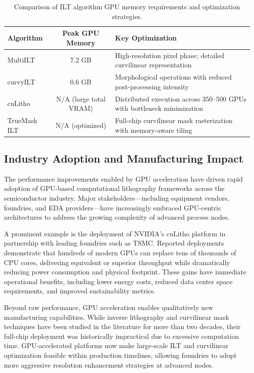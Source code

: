 \documentclass[pdflatex,sn-mathphys-num]{sn-jnl}%
\theoremstyle{thmstyleone}%
\theoremstyle{thmstyletwo}%
\theoremstyle{thmstylethree}%
\begin{document}
\begin{table}[t]
\centering
\small
\setlength{\tabcolsep}{6pt}
\begin{tabularx}{\linewidth}{|l|c|X|}
\hline
\textbf{Algorithm} & \textbf{Peak GPU Memory} & \textbf{Key Optimization} \\ 
\hline
MultiILT & 7.2 GB &
High-resolution pixel phase; detailed curvilinear representation \\ 
\hline
curvyILT & 0.6 GB &
Morphological operations with reduced post-processing intensity \\ 
\hline
cuLitho & N/A (large total VRAM) &
Distributed execution across 350--500 GPUs with bottleneck minimization \\ 
\hline
TrueMask ILT & N/A (optimized) &
Full-chip curvilinear mask rasterization with memory-aware tiling \\ 
\hline
\end{tabularx}
\caption{Comparison of ILT algorithm GPU memory requirements and optimization strategies.}
\label{tab:ilt_gpu_memory}
\end{table}



\subsection{Industry Adoption and Manufacturing Impact}
The performance improvements enabled by GPU acceleration have driven rapid adoption of GPU-based computational lithography frameworks across the semiconductor industry. Major stakeholders—including equipment vendors, foundries, and EDA providers—have increasingly embraced GPU-centric architectures to address the growing complexity of advanced process nodes.

A prominent example is the deployment of NVIDIA’s cuLitho platform in partnership with leading foundries such as TSMC. Reported deployments demonstrate that hundreds of modern GPUs can replace tens of thousands of CPU cores, delivering equivalent or superior throughput while dramatically reducing power consumption and physical footprint. These gains have immediate operational benefits, including lower energy costs, reduced data center space requirements, and improved sustainability metrics.

Beyond raw performance, GPU acceleration enables qualitatively new manufacturing capabilities. While inverse lithography and curvilinear mask techniques have been studied in the literature for more than two decades, their full-chip deployment was historically impractical due to excessive computation time. GPU-accelerated platforms now make large-scale ILT and curvilinear optimization feasible within production timelines, allowing foundries to adopt more aggressive resolution enhancement strategies at advanced nodes.
\end{document}
